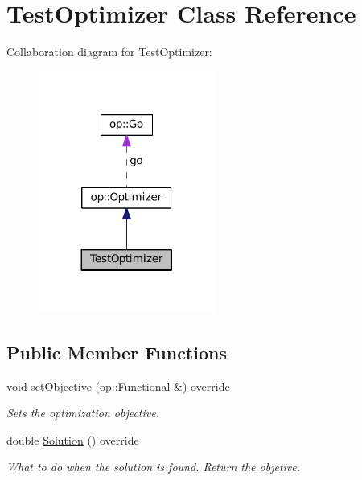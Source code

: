 \hypertarget{classTestOptimizer}{\section{Test\-Optimizer Class Reference}
\label{classTestOptimizer}
}


Collaboration diagram for Test\-Optimizer\-:
\nopagebreak
\begin{figure}[H]
\begin{center}
\leavevmode
\includegraphics[width=164pt]{classTestOptimizer__coll__graph}
\end{center}
\end{figure}
\subsection*{Public Member Functions}
\begin{DoxyCompactItemize}
\item 
void \hyperlink{classTestOptimizer_acf4e70d78cbbb9dd44e002575d4477f7}{set\-Objective} (\hyperlink{classop_1_1Functional}{op\-::\-Functional} \&) override
\begin{DoxyCompactList}\small\item\em Sets the optimization objective. \end{DoxyCompactList}\item 
\hypertarget{classTestOptimizer_aaaaf8cea0b84a3327965dc89dfb2cd77}{double \hyperlink{classTestOptimizer_aaaaf8cea0b84a3327965dc89dfb2cd77}{Solution} () override}\label{classTestOptimizer_aaaaf8cea0b84a3327965dc89dfb2cd77}

\begin{DoxyCompactList}\small\item\em What to do when the solution is found. Return the objetive. \end{DoxyCompactList}\end{DoxyCompactItemize}
